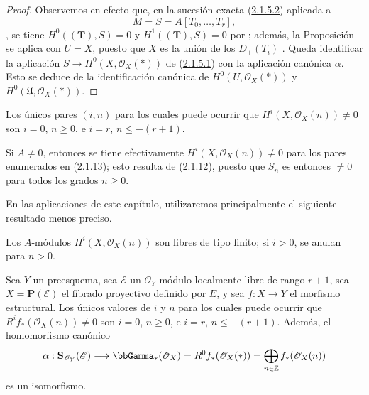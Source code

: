 \begin{proof}
Observemos en efecto que, en la sucesión exacta
(\hyperref[III.2.1.5.2-fr]{2.1.5.2}) aplicada a
\[
M=S=A[T_0,\ldots,T_r],
\],
se tiene
$H^0((\mathbf T),S)=0$ y $H^1((\mathbf T),S)=0$ por ; además, la Proposición~ se aplica con $U=X$, puesto que $X$ es la unión de los $D_+(T_i)$ .
Queda identificar la aplicación $S\to H^0(X,\mathcal O_X(*))$ de (\hyperref[III.2.1.5.2]{2.1.5.1}) con la aplicación canónica $\alpha$.
Esto se deduce de la identificación canónica de $H^0(U,\mathcal O_X(*))$ y $H^0(\mathfrak U,\mathcal O_X(*))$.
\end{proof}

\begin{corollary}[2.1.13]
\label{III.2.1.13}
\label{III.2.1.13-fr}
Los únicos pares $(i,n)$ para los cuales puede ocurrir que $H^i(X,\mathcal O_X(n))\neq0$ son $i=0$, $n\geq0$, e $i=r$, $n\leq-(r+1)$.
\end{corollary}

Si $A\neq0$, entonces se tiene efectivamente $H^i(X,\mathcal O_X(n))\neq0$ para los pares enumerados en
(\hyperref[III.2.1.13-fr]{2.1.13}); esto resulta de
(\hyperref[III.2.1.12-fr]{2.1.12}), puesto que $S_n$ es entonces $\neq0$ para
todos los grados $n\geq0$.

En las aplicaciones de este capítulo, utilizaremos principalmente el siguiente resultado menos preciso.

\begin{corollary}[2.1.14]
\label{III.2.1.14}
\label{III.2.1.14-fr}
Los $A$-módulos $H^i(X,\mathcal O_X(n))$ son libres de tipo finito; si $i>0$, se anulan para $n>0$.
\end{corollary}

\begin{proposition}[2.1.15]
\label{III.2.1.15}
\label{III.2.1.15-fr}
Sea $Y$ un preesquema, sea $\mathcal E$ un $\mathcal O_Y$-módulo localmente libre de rango $r+1$, sea $X=\mathbf P(\mathcal E)$ el fibrado proyectivo definido por $E$, y sea $f:X\to Y$ el morfismo estructural.
Los únicos valores de $i$ y $n$ para los cuales puede ocurrir que $R^if_*(\mathcal O_X(n))\neq0$ son $i=0$, $n\geq0$, e $i=r$, $n\leq-(r+1)$.
Además, el homomorfismo canónico 
\[
\alpha:\mathbf S_{\mathcal O_Y}(\mathcal E)
\longrightarrow\bbGamma_*(\mathcal O_X)
=R^0f_*(\mathcal O_X(*))
=\bigoplus_{n\in\mathbb Z}f_*(\mathcal O_X(n))
\]
es un isomorfismo.
\end{proposition}


